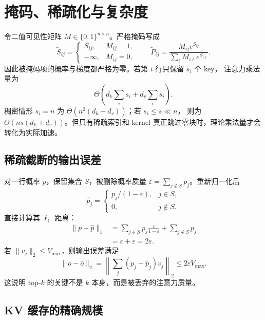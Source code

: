 \documentclass[11pt]{article}
\numberwithin{equation}{section}
\newcommand{\1}{\mathbf{1}}
\begin{document}
\section{掩码、稀疏化与复杂度}

令二值可见性矩阵 $M\in\{0,1\}^{n\times n}$。严格掩码写成
\begin{equation}
 \widetilde S_{ij}=
 \begin{cases}
 S_{ij},&M_{ij}=1,\\
 -\infty,&M_{ij}=0,
 \end{cases}
 \qquad
 \widetilde P_{ij}=\frac{M_{ij}e^{S_{ij}}}
 {\sum_\ell M_{i\ell}e^{S_{i\ell}}}.
\end{equation}
因此被掩码项的概率与梯度都严格为零。若第 $i$ 行只保留 $s_i$ 个 key，
注意力乘法量为
\begin{equation}
 \Theta\!\left(d_k\sum_i s_i+d_v\sum_i s_i\right).
\end{equation}
稠密情形 $s_i=n$ 为 $\Theta(n^2(d_k+d_v))$；若 $s_i\le s\ll n$，
则为 $\Theta(ns(d_k+d_v))$。但只有稀疏索引和 kernel 真正跳过零块时，理论乘法量才会转化为实际加速。

\subsection{稀疏截断的输出误差}

对一行概率 $p$，保留集合 $S$，被删除概率质量
$\varepsilon=\sum_{j\notin S}p_j$。重新归一化后
\begin{equation}
 \widehat p_j=
 \begin{cases}
 p_j/(1-\varepsilon),&j\in S,\\
 0,&j\notin S.
 \end{cases}
\end{equation}
直接计算其 $\ell_1$ 距离：
\begin{align}
 \|p-\widehat p\|_1
 &=\sum_{j\in S}p_j\frac{\varepsilon}{1-\varepsilon}
   +\sum_{j\notin S}p_j\\
 &=\varepsilon+\varepsilon=2\varepsilon.
\end{align}
若 $\|v_j\|_2\le V_{\max}$，则输出误差满足
\begin{equation}
 \|o-\widehat o\|_2
 =\left\|\sum_j(p_j-\widehat p_j)v_j\right\|_2
 \le 2\varepsilon V_{\max}.
\end{equation}
这说明 top-$k$ 的关键不是 $k$ 本身，而是被丢弃的注意力质量。

\subsection{KV 缓存的精确规模}
\end{document}
